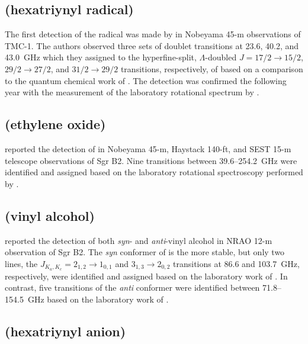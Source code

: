 \documentclass[twocolumn]{aastex631}
\begin{document}
	\subsection{ (hexatriynyl radical)}
	\label{C6H}
	
	The first detection of the  radical was made by \citet{Suzuki:1986bc} in Nobeyama 45-m observations of TMC-1.  The authors observed three sets of doublet transitions at 23.6, 40.2, and 43.0~GHz which they assigned to the hyperfine-split, $\Lambda$-doubled $J = 17/2\rightarrow15/2$, $29/2\rightarrow27/2$, and $31/2\rightarrow29/2$ transitions, respectively, of  based on a comparison to the quantum chemical work of \citet{Murakami:1987ys}.  The detection was confirmed the following year with the measurement of the laboratory rotational spectrum by \citet{Pearson:1988qm}.
	
	\subsection{ (ethylene oxide)}
	\label{c-C2H4O}
	
	\citet{Dickens:1997fb} reported the detection of  in Nobeyama 45-m, Haystack 140-ft, and SEST 15-m telescope observations of Sgr B2.  Nine transitions between 39.6--254.2~GHz were identified and assigned based on the laboratory rotational spectroscopy performed by \citet{Hirose:1974wq}.
	
	\subsection{ (vinyl alcohol)}
	\label{CH2CHOH}
	
	\citet{Turner:2001jk} reported the detection of both \emph{syn}- and \emph{anti}-vinyl alcohol in NRAO 12-m observation of Sgr B2.  The \emph{syn} conformer of  is the more stable, but only two lines, the $J_{K_a,K_c} = 2_{1,2}\rightarrow1_{0,1}$ and $3_{1,3}\rightarrow2_{0,2}$ transitions at 86.6 and 103.7~GHz, respectively, were identified and assigned based on the laboratory work of \citet{Kaushik:1977je}.  In contrast, five transitions of the \emph{anti} conformer were identified between 71.8--154.5~GHz based on the laboratory work of \citet{Rodler:1985dd}.
	
	\subsection{ (hexatriynyl anion)}
	\label{C6H-}
	
\end{document}
